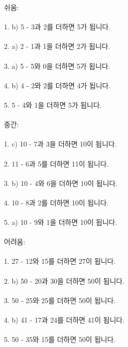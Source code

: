 \documentclass[fleqn]{article}
\begin{document}
      
        

쉬움: \\\\  
1. b) 5 - 3과 2를 더하면 5가 됩니다. \\\\  
2. a) 2 - 1과 1을 더하면 2가 됩니다. \\\\  
3. a) 5 - 5와 0을 더하면 5가 됩니다. \\\\  
4. b) 4 - 2와 2를 더하면 4가 됩니다. \\\\  
5. 5 - 4와 1을 더하면 5가 됩니다. \\\\  

중간: \\\\  
1. c) 10 - 7과 3을 더하면 10이 됩니다. \\\\  
2. 11 - 6과 5를 더하면 11이 됩니다. \\\\  
3. b) 10 - 4와 6을 더하면 10이 됩니다. \\\\  
4. 10 - 8과 2를 더하면 10이 됩니다. \\\\  
5. a) 10 - 9와 1을 더하면 10이 됩니다. \\\\  

어려움: \\\\  
1. 27 - 12와 15를 더하면 27이 됩니다. \\\\  
2. b) 50 - 20과 30을 더하면 50이 됩니다. \\\\  
3. 50 - 25와 25를 더하면 50이 됩니다. \\\\  
4. b) 41 - 17과 24를 더하면 41이 됩니다. \\\\  
5. 50 - 35와 15를 더하면 50이 됩니다. \\\\        
      
\end{document}
